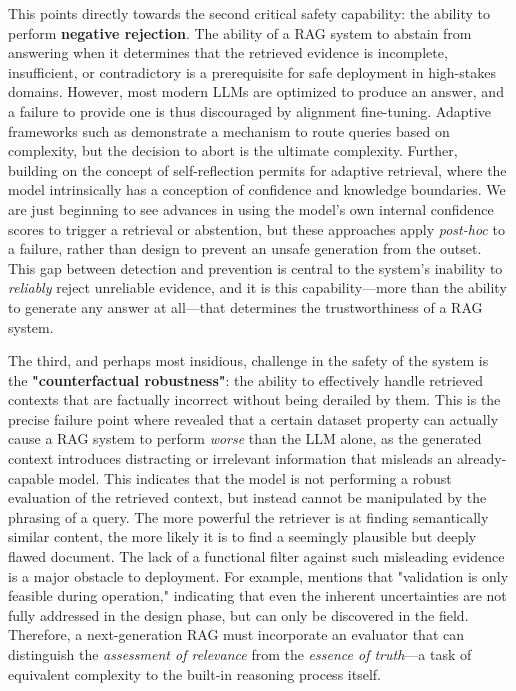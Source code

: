 \documentclass[11pt,a4paper]{article}
\begin{document}
This points directly towards the second critical safety capability: the ability to perform \textbf{negative rejection}. The ability of a RAG system to abstain from answering when it determines that the retrieved evidence is incomplete, insufficient, or contradictory is a prerequisite for safe deployment in high-stakes domains. However, most modern LLMs are optimized to produce an answer, and a failure to provide one is thus discouraged by alignment fine-tuning. Adaptive frameworks such as \cite{arxiv:2403.14403v2} demonstrate a mechanism to route queries based on complexity, but the decision to abort is the ultimate complexity. Further, building on the concept of self-reflection \cite{arxiv:2310.11511v1} permits for adaptive retrieval, where the model intrinsically has a conception of confidence and knowledge boundaries. We are just beginning to see advances in using the model's own internal confidence scores to trigger a retrieval or abstention, but these approaches apply \emph{post-hoc} to a failure, rather than design to prevent an unsafe generation from the outset. This gap between detection and prevention is central to the system's inability to \emph{reliably} reject unreliable evidence, and it is this capability---more than the ability to generate any answer at all---that determines the trustworthiness of a RAG system.

The third, and perhaps most insidious, challenge in the safety of the system is the \textbf{"counterfactual robustness"}: the ability to effectively handle retrieved contexts that are factually incorrect without being derailed by them. This is the precise failure point where \cite{arxiv:2402.13178v2} revealed that a certain dataset property can actually cause a RAG system to perform \emph{worse} than the LLM alone, as the generated context introduces distracting or irrelevant information that misleads an already-capable model. This indicates that the model is not performing a robust evaluation of the retrieved context, but instead cannot be manipulated by the phrasing of a query. The more powerful the retriever is at finding semantically similar content, the more likely it is to find a seemingly plausible but deeply flawed document. The lack of a functional filter against such misleading evidence is a major obstacle to deployment. For example, \cite{arxiv:2401.05856v1} mentions that "validation is only feasible during operation," indicating that even the inherent uncertainties are not fully addressed in the design phase, but can only be discovered in the field. Therefore, a next-generation RAG must incorporate an evaluator that can distinguish the \emph{assessment of relevance} from the \emph{essence of truth}---a task of equivalent complexity to the built-in reasoning process itself.
\end{document}
